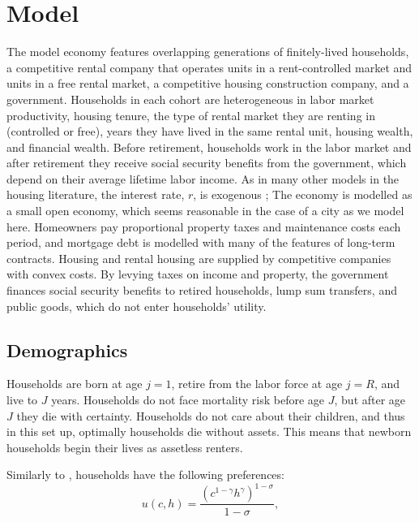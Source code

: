 \documentclass[parskip=full]{article}
\begin{document}
\section{Model}\label{sec:model}

The model economy features overlapping generations of finitely-lived households, a competitive rental company that operates units in a rent-controlled market and units in a free rental market, a competitive housing construction company, and a government. Households in each cohort are heterogeneous in labor market productivity, housing tenure, the type of rental market they are renting in (controlled or free), years they have lived in the same rental unit, housing wealth, and financial wealth. Before retirement, households work in the labor market and after retirement they receive social security benefits from the government, which depend on their average lifetime labor income. As in many other models in the housing literature, the interest rate, $r$, is exogenous \citep{sommeretal-2013,arslanetal-2015,sommersullivan-2017,kaplanetal-2019}; The economy is modelled as a small open economy, which seems reasonable in the case of a city as we model here. Homeowners pay proportional property taxes and maintenance costs each period, and mortgage debt is modelled with many of the features of long-term contracts. Housing and rental housing are supplied by competitive companies with convex costs. By levying taxes on income and property, the government finances social security benefits to retired households, lump sum transfers, and public goods, which do not enter households' utility.

\subsection{Demographics}\label{subsection:demographics}

Households are born at age $j=1$, retire from the labor force at age $j=R$, and live to $J$ years. Households do not face mortality risk before age $J$, but after age $J$ they die with certainty. Households do not care about their children, and thus in this set up, optimally households die without assets. This means that newborn households begin their lives as assetless renters.

Similarly to \citet{sommersullivan-2017}, households have the following preferences:
\begin{equation*}
    u(c,h)=\frac{\left(c^{1-\gamma} h^{\gamma}\right)^{1-\sigma}}{1-\sigma},
\end{equation*}
\end{document}
